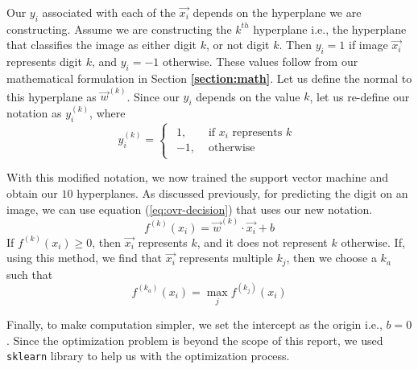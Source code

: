 Our ${y_i}$ associated with each of the $\vec{x_i}$ depends on the hyperplane we are constructing. Assume we are constructing the $k^{th}$ hyperplane i.e., the hyperplane that classifies the image as either digit $k$, or not digit $k$. Then $y_i = 1$ if image $\vec{x_i}$ represents digit $k$, and $y_i = -1$ otherwise. These values follow from our mathematical formulation in Section \textbf{\ref{section:math}}. Let us define the normal to this hyperplane as $\vec{w}^{(k)}$. Since our $y_i$ depends on the value $k$, let us re-define our notation as $y^{(k)}_i$, where
\begin{equation*}
    y^{(k)}_i= 
\begin{cases}
\begin{aligned}
 1,& \text{ if } x_i \text{ represents } k\\
-1,              & \text{ otherwise}
\end{aligned}
\end{cases}
\end{equation*}

With this modified notation, we now trained the support vector machine and obtain our $10$ hyperplanes. As discussed previously, for predicting the digit on an image, we can use equation (\ref{eq:ovr-decision}) that uses our new notation.
\begin{equation}
	f^{(k)}(x_i) = \vec{w}^{(k)}\cdot\vec{x_i} + b \label{eq:ovr-decision}
\end{equation}
If $f^{(k)}(x_i) \geq 0$, then $\vec{x_i}$ represents $k$, and it does not represent $k$ otherwise. If, using this method, we find that $\vec{x_i}$ represents multiple $k_j$, then we choose a $k_a$ such that
\begin{equation*}
	f^{(k_a)}(x_i) = \max_{j} f^{(k_j)}(x_i)  \label{eq:ovr-conflict}
\end{equation*}

Finally, to make computation simpler, we set the intercept as the origin i.e., $b = 0$. Since the optimization problem is beyond the scope of this report, we used \texttt{sklearn}\cite{scikit-learn} library to help us with the optimization process.